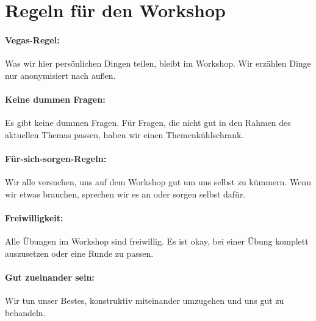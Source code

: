 \section{Regeln für den Workshop}
\label{gfk-workshopregeln}

\paragraph{Vegas-Regel:} Was wir hier persönlichen Dingen teilen, bleibt im Workshop. Wir erzählen Dinge nur anonymisiert nach außen.

\paragraph{Keine dummen Fragen:} Es gibt keine dummen Fragen. Für Fragen, die nicht gut in den Rahmen des aktuellen Themas passen, haben wir einen Themenkühlschrank.

\paragraph{Für-sich-sorgen-Regeln:} Wir alle versuchen, uns auf dem Workshop gut um uns selbst zu kümmern. Wenn wir etwas brauchen, sprechen wir es an oder sorgen selbst dafür.

\paragraph{Freiwilligkeit:} Alle Übungen im Workshop sind freiwillig. Es ist okay, bei einer Übung komplett auszusetzen oder eine Runde zu passen.

\paragraph{Gut zueinander sein:} Wir tun unser Bestes, konstruktiv miteinander umzugehen und uns gut zu behandeln.
